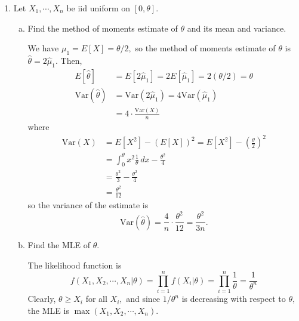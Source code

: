 \documentclass{article}
\newcommand{\var}{\mathrm{Var}}
\begin{document}
\begin{enumerate}
\begin{enumerate}[(a)]
\begin{proof}
				\end{proof}
				
		\end{enumerate}

	\item Let $X_1, \cdots, X_n$ be iid uniform on $[0, \theta].$

		\begin{enumerate}[a.]
			\item Find the method of moments estimate of $\theta$ and its mean and variance.
				\begin{soln}
					We have $\mu_1=E[X]=\theta/2,$ so the method of moments estimate of $\theta$ is $\hat{\theta}=2\hat{\mu}_1.$ Then,
					\begin{align*}
						E[\hat{\theta}] &= E[2\hat{\mu}_1]=2E[\hat{\mu}_1]=2(\theta/2)=\theta \\
						\var(\hat{\theta}) &= \var(2\hat{\mu}_1) = 4\var(\hat{\mu}_1) \\
						&= 4\cdot\frac{\var(X)}{n} 
					\end{align*} where 
					\begin{align*}
						\var(X) &= E[X^2]-(E[X])^2 = E[X^2] - \left( \frac{\theta}{2} \right)^2 \\
						&= \int_0^\theta x^2\frac{1}{\theta}\, dx - \frac{\theta^2}{4} \\
						&= \frac{\theta^2}{3}-\frac{\theta^2}{4} \\
						&= \frac{\theta^2}{12}
					\end{align*} so the variance of the estimate is \[\var(\hat{\theta}) = \frac{4}{n}\cdot\frac{\theta^2}{12}= \frac{\theta^2}{3n}.\]
					
				\end{soln}

			\item Find the MLE of $\theta.$
				\begin{soln}
					The likelihood function is \[f(X_1, X_2, \cdots, X_n|\theta)=\prod_{i=1}^n f(X_i|\theta)=\prod_{i=1}^n \frac{1}{\theta}=\frac{1}{\theta^n}\] Clearly, $\theta\ge X_i$ for all $X_i,$ and since $1/\theta^n$ is decreasing with respect to $\theta,$ the MLE is $\max{(X_1, X_2, \cdots, X_n)}.$
					
				\end{soln}


\end{enumerate}
\end{enumerate}
\end{document}

